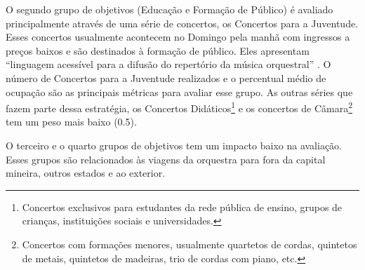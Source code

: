 \documentclass[a4paper, 12pt, openright, oneside, german, french, english, brazil]{abntex2}
\begin{document}
	
	O segundo grupo de objetivos (Educação e Formação de Público) é avaliado principalmente através de uma série de concertos, os Concertos para a Juventude. Esses concertos usualmente acontecem no Domingo pela manhã com ingressos a preços baixos e são destinados à formação de público. Eles apresentam ``linguagem acessível para a difusão do repertório da música orquestral'' \cite[p. 9]{filarmonica2017gerencial}. O número de Concertos para a Juventude realizados e o percentual médio de ocupação são as principais métricas para avaliar esse grupo. As outras séries que fazem parte dessa estratégia, os Concertos Didáticos\footnote{Concertos exclusivos para estudantes da rede pública de ensino, grupos de crianças, instituições sociais e universidades.} e os concertos de Câmara\footnote{Concertos com formações menores, usualmente quartetos de cordas, quintetos de metais, quintetos de madeiras, trio de cordas com piano, etc.} tem um peso mais baixo (0.5).
	
	
	O terceiro e o quarto grupos de objetivos tem um impacto baixo na avaliação. Esses grupos são relacionados às viagens da orquestra para fora da capital mineira, outros estados e ao exterior.
	
	
\end{document}
